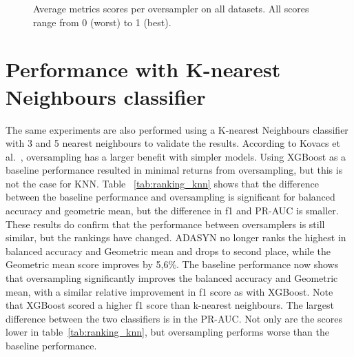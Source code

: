 \begin{figure}[htp]
\centering
    \quad
    
    \medskip
     \quad
    
    \medskip
    \quad
    
\caption{Average metrics scores per oversampler on all datasets. All scores range from 0 (worst) to 1 (best).}
\label{fig:Total}
\end{figure}

\section{Performance with K-nearest Neighbours classifier}
The same experiments are also performed using a K-nearest Neighbours classifier with 3 and 5 nearest neighbours to validate the results. According to Kovacs et al.~\cite{Kovacs2019AnDatasets}, oversampling has a larger benefit with simpler models. Using XGBoost as a baseline performance resulted in minimal returns from oversampling, but this is not the case for KNN. Table ~\ref{tab:ranking_knn} shows that the difference between the baseline performance and oversampling is significant for balanced accuracy and geometric mean, but the difference in f1 and PR-AUC is smaller. These results do confirm that the performance between oversamplers is still similar, but the rankings have changed. ADASYN no longer ranks the highest in balanced accuracy and Geometric mean and drops to second place, while the Geometric mean score improves by 5,6\%. The baseline performance now shows that oversampling significantly improves the balanced accuracy and Geometric mean, with a similar relative improvement in f1 score as with XGBoost. Note that XGBoost scored a higher f1 score than k-nearest neighbours. The largest difference between the two classifiers is in the PR-AUC. Not only are the scores lower in table~\ref{tab:ranking_knn}, but oversampling performs worse than the baseline performance.

